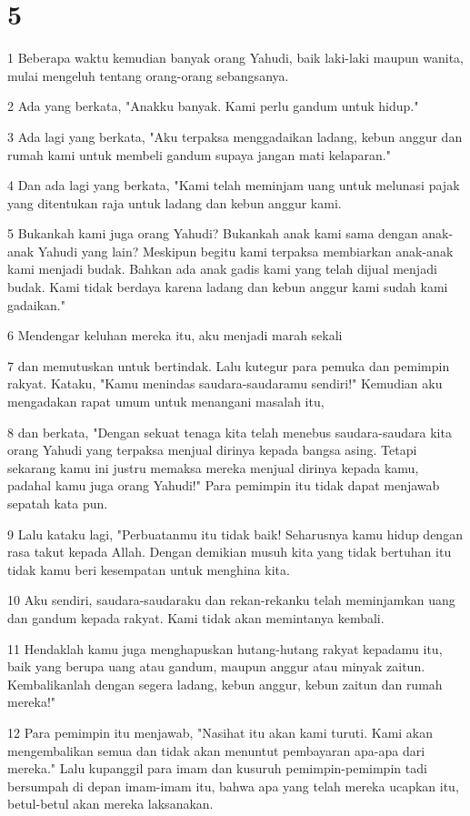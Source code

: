 \chapter{5}

\par 1 Beberapa waktu kemudian banyak orang Yahudi, baik laki-laki maupun wanita, mulai mengeluh tentang orang-orang sebangsanya.
\par 2 Ada yang berkata, "Anakku banyak. Kami perlu gandum untuk hidup."
\par 3 Ada lagi yang berkata, "Aku terpaksa menggadaikan ladang, kebun anggur dan rumah kami untuk membeli gandum supaya jangan mati kelaparan."
\par 4 Dan ada lagi yang berkata, "Kami telah meminjam uang untuk melunasi pajak yang ditentukan raja untuk ladang dan kebun anggur kami.
\par 5 Bukankah kami juga orang Yahudi? Bukankah anak kami sama dengan anak-anak Yahudi yang lain? Meskipun begitu kami terpaksa membiarkan anak-anak kami menjadi budak. Bahkan ada anak gadis kami yang telah dijual menjadi budak. Kami tidak berdaya karena ladang dan kebun anggur kami sudah kami gadaikan."
\par 6 Mendengar keluhan mereka itu, aku menjadi marah sekali
\par 7 dan memutuskan untuk bertindak. Lalu kutegur para pemuka dan pemimpin rakyat. Kataku, "Kamu menindas saudara-saudaramu sendiri!" Kemudian aku mengadakan rapat umum untuk menangani masalah itu,
\par 8 dan berkata, "Dengan sekuat tenaga kita telah menebus saudara-saudara kita orang Yahudi yang terpaksa menjual dirinya kepada bangsa asing. Tetapi sekarang kamu ini justru memaksa mereka menjual dirinya kepada kamu, padahal kamu juga orang Yahudi!" Para pemimpin itu tidak dapat menjawab sepatah kata pun.
\par 9 Lalu kataku lagi, "Perbuatanmu itu tidak baik! Seharusnya kamu hidup dengan rasa takut kepada Allah. Dengan demikian musuh kita yang tidak bertuhan itu tidak kamu beri kesempatan untuk menghina kita.
\par 10 Aku sendiri, saudara-saudaraku dan rekan-rekanku telah meminjamkan uang dan gandum kepada rakyat. Kami tidak akan memintanya kembali.
\par 11 Hendaklah kamu juga menghapuskan hutang-hutang rakyat kepadamu itu, baik yang berupa uang atau gandum, maupun anggur atau minyak zaitun. Kembalikanlah dengan segera ladang, kebun anggur, kebun zaitun dan rumah mereka!"
\par 12 Para pemimpin itu menjawab, "Nasihat itu akan kami turuti. Kami akan mengembalikan semua dan tidak akan menuntut pembayaran apa-apa dari mereka." Lalu kupanggil para imam dan kusuruh pemimpin-pemimpin tadi bersumpah di depan imam-imam itu, bahwa apa yang telah mereka ucapkan itu, betul-betul akan mereka laksanakan.

